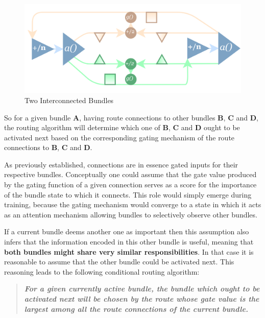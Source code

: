 \begin{figure}[h]
    \centering 
     \includegraphics[width=\textwidth]{PICs/NARU/connected-naru-bundles.png}
    \caption{Two Interconnected Bundles}
    \label{connecting-naru-bundles}
\end{figure}


So for a given bundle \textbf{A}, having route connections to other bundles \textbf{B}, \textbf{C} and \textbf{D}, the routing algorithm will determine which one of \textbf{B}, \textbf{C} and \textbf{D} ought to be activated next based on the corresponding gating mechanism of the route connections to \textbf{B}, \textbf{C} and \textbf{D}.
 
 \clearpage

As previously established, connections are in essence gated inputs for their respective bundles.
Conceptually one could assume that the gate value produced by the gating function of a given connection serves as a score for the importance of the bundle state to which it connects. This role would simply emerge during training, because the gating mechanism would converge to a state in which it acts as an attention mechanism allowing bundles to selectively observe other bundles. \linebreak
 
 If a current bundle deems another one as important
then this assumption also infers that the information encoded in this other bundle is useful, meaning that \textbf{both bundles might share very similar responsibilities}.  
In that case it is reasonable to assume that the other bundle could be activated next.
This reasoning leads to the following conditional routing algorithm:\linebreak
 

\begin{quote}
\textbf{\textit{For a given currently active bundle, the bundle which ought to be activated next will be chosen by the route whose gate value is the largest among all the route connections of the current bundle. }}
\end{quote}

